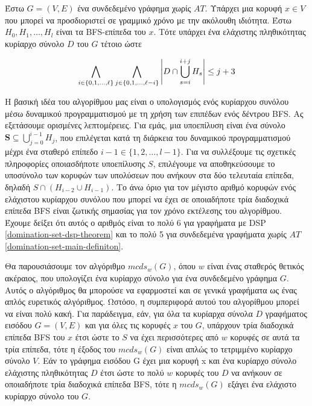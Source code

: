\begin{theorem}
	\label{domination-set-main-definiton}
	Έστω $G = (V,E)$ ένα συνδεδεμένο γράφημα χωρίς $AT$. Υπάρχει μια κορυφή $x\in V$
	που μπορεί να προσδιοριστεί σε γραμμικό χρόνο με την ακόλουθη ιδιότητα. Έστω $H_0,H_1,\dots , H_l$
	είναι τα BFS-επίπεδα του $x$. Τότε υπάρχει ένα ελάχιστης πληθικότητας κυρίαρχο σύνολο $D$ του $G$ τέτοιο ώστε
\end{theorem}

\begin{center}
	\[
	\displaystyle \LARGE  \bigwedge_{i\in\{0,1,\ldots,\ell\}} \bigwedge_{j\in\{0,1,\ldots,\ell-i\}} \left|D\cap\bigcup_{s=i}^{i+j}H_{s}\right| \leq j+3
	\]
\end{center}

Η βασική ιδέα του αλγορίθμου μας είναι ο υπολογισμός ενός κυρίαρχου συνόλου μέσω δυναμικού προγραμματισμού με τη χρήση των επιπέδων ενός δέντρου BFS. Ας εξετάσουμε ορισμένες λεπτομέρειες. Για εμάς, μια υποεπίλυση είναι ένα σύνολο $\mathbf{S}\subseteq\bigcup_{j=0}^{i-1}H_{j}$, που επιλέγεται κατά τη διάρκεια του δυναμικού προγραμματισμού μέχρι ένα σταθερό επίπεδο \( i - 1 \in \{1, 2, \dots ,l-1\} \). Για να συλλέξουμε τις σχετικές πληροφορίες οποιασδήποτε υποεπίλυσης \( S \), επιλέγουμε να αποθηκεύσουμε το υποσύνολο των κορυφών των υπολύσεων που ανήκουν στα δύο τελευταία επίπεδα, δηλαδή \( S \cap (H_{i-2} \cup H_{i-1}) \). Το άνω όριο για τον μέγιστο αριθμό κορυφών ενός ελάχιστου κυρίαρχου συνόλου που μπορεί να έχει σε οποιαδήποτε τρία διαδοχικά επίπεδα BFS είναι ζωτικής σημασίας για τον χρόνο εκτέλεσης του αλγορίθμου. Έχουμε δείξει ότι αυτός ο αριθμός είναι το πολύ 6 για γραφήματα με DSP \ref{domination-set-dsp-theorem}  και το πολύ 5 για συνδεδεμένα γραφήματα χωρίς \(AT\) \ref{domination-set-main-definiton}.


Θα παρουσιάσουμε τον αλγόριθμο $mcds_w(G)$, όπου $w$ είναι ένας σταθερός θετικός ακέραιος, που υπολογίζει ένα κυρίαρχο σύνολο για ένα συνδεδεμένο γράφημα $G$. Αυτός ο αλγόριθμος θα μπορούσε να εφαρμοστεί και σε γενικά γραφήματα ως ένας απλός ευρετικός αλγόριθμος. Ωστόσο, η συμπεριφορά αυτού του αλγορίθμου μπορεί να είναι πολύ κακή. Για παράδειγμα, εάν, για όλα τα κυρίαρχα σύνολα $D$ γραφήματος εισόδου $G = (V, E)$ και για όλες τις κορυφές $x$ του $G$, υπάρχουν τρία διαδοχικά επίπεδα BFS του $x$ έτσι ώστε το $S$ να έχει περισσότερες από $w$ κορυφές σε αυτά τα τρία επίπεδα, τότε η έξοδος του $mcds_w(G)$ είναι απλώς το τετριμμένο κυρίαρχο σύνολο $V$. Εάν το γράφημα εισόδου G έχει μια κορυφή x και ένα κυρίαρχο σύνολο ελάχιστης πληθικότητας $D$ έτσι ώστε το πολύ $w$ κορυφές του $D$ να ανήκουν σε οποιαδήποτε τρία διαδοχικά επίπεδα BFS, τότε η $mcds_w(G)$ εξάγει ένα ελάχιστο κυρίαρχο σύνολο του $G$.


